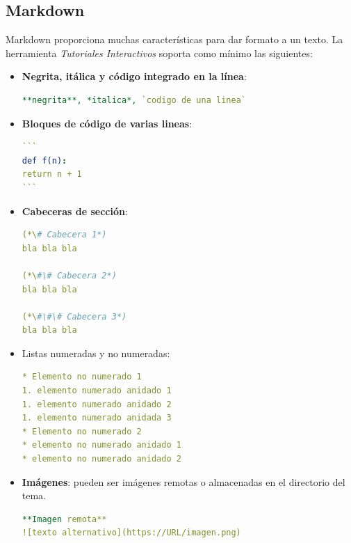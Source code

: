 \documentclass[]{article}
\newcommand{\toolname}{\emph{Tutoriales Interactivos}}
\begin{document}
\subsection{Markdown}
Markdown proporciona muchas características para dar formato a un texto. La herramienta \toolname{} soporta como mínimo las siguientes:
\begin{itemize}
	\item \textbf{Negrita, itálica y código integrado en la línea}:
\begin{lstlisting}[language=yaml,numbers=none]
**negrita**, *italica*, `codigo de una linea`
\end{lstlisting}	
	\item \textbf{Bloques de código de varias lineas}:
\begin{lstlisting}[language=yaml,numbers=none]
```
def f(n):
return n + 1
```
\end{lstlisting}
	\item \textbf{Cabeceras de sección}:
\begin{lstlisting}[language=yaml,numbers=none]
(*\# Cabecera 1*)
bla bla bla

(*\#\# Cabecera 2*)
bla bla bla

(*\#\#\# Cabecera 3*)
bla bla bla
\end{lstlisting}
	\item Listas numeradas y no numeradas:
\begin{lstlisting}[language=yaml,numbers=none]
* Elemento no numerado 1
1. elemento numerado anidado 1
1. elemento numerado anidado 2
1. elemento numerado anidada 3
* Elemento no numerado 2
* elemento no numerado anidado 1
* elemento no numerado anidado 2 
\end{lstlisting}	
	\item \textbf{Imágenes}: pueden ser imágenes remotas o almacenadas en el directorio del tema.
\begin{lstlisting}[language=yaml,numbers=none]
**Imagen remota**
![texto alternativo](https://URL/imagen.png)


\end{lstlisting}
\end{itemize}
\end{document}
